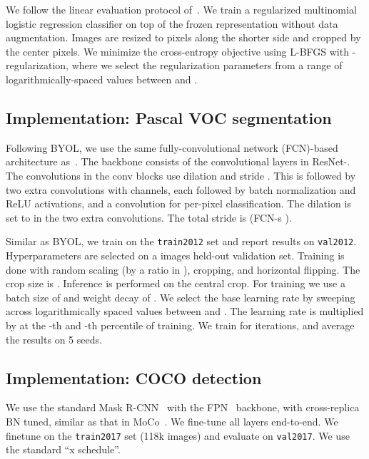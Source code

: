 \documentclass[final]{cvpr}
\begin{document}
We follow the linear evaluation protocol of~\cite{kolesnikov2019revisiting,kornblith2019better,chen2020simple,grill2020bootstrap}. 
We train a regularized multinomial logistic regression classifier on top of the frozen representation without data augmentation. Images are resized to  pixels along the shorter side and cropped by the center  pixels.
We minimize the cross-entropy objective using L-BFGS with -regularization, where we select the regularization parameters from a range of  logarithmically-spaced values between  and . 

\subsection{Implementation: Pascal VOC segmentation}

Following BYOL, we use the same fully-convolutional network (FCN)-based~\cite{long2015fully} architecture as~\cite{he2020momentum}. The backbone consists of the convolutional layers in ResNet-. The  convolutions in the conv blocks use dilation  and stride . This is followed by two extra  convolutions with  channels, each followed by batch normalization and ReLU activations, and a  convolution for per-pixel classification. The dilation is set to  in the two extra  convolutions. The total stride is  (FCN-s \cite{long2015fully}).

Similar as BYOL, we train on the \texttt{train2012\xspace} set and report results on \texttt{val2012\xspace}. Hyperparameters are selected on a  images held-out validation set. Training is done with random scaling (by a ratio in ), cropping, and horizontal flipping. The crop size is . Inference is performed on the  central crop. For training we use a batch size of  and weight decay of . We select the base learning rate by sweeping across  logarithmically spaced values between  and . The learning rate is multiplied by  at the -th and -th percentile of training. We train for  iterations, and average the results on 5 seeds.

\subsection{Implementation: COCO detection}

We use the standard Mask R-CNN~\cite{he2017mask} with the FPN~\cite{lin2017feature} backbone, with cross-replica BN tuned, similar as that in MoCo~\cite{he2020momentum}. We fine-tune all layers end-to-end. We finetune on the \texttt{train2017} set (118k images) and evaluate on \texttt{val2017}. We use the standard ``x schedule''. 
\end{document}
